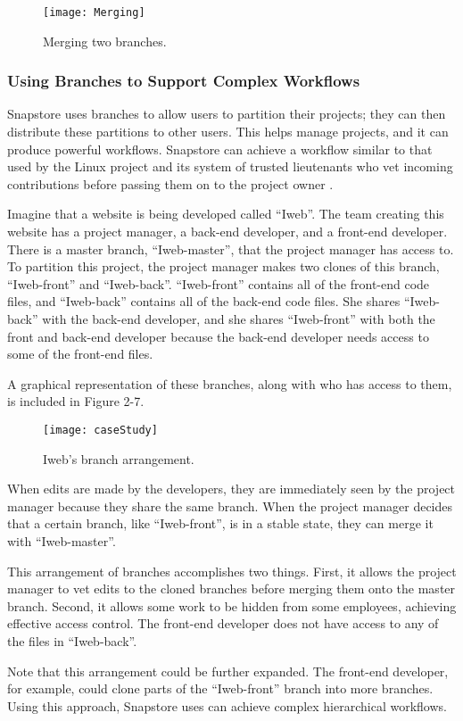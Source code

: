 \begin{figure}
\texttt{[image: Merging]}
\caption{Merging two branches.}
\label{arm:fig1}
\end{figure}

\subsubsection{Using Branches to Support Complex Workflows}

Snapstore uses branches to allow users to partition their projects; they can then distribute these partitions to other users. This helps manage projects, and it can produce powerful workflows. Snapstore can achieve a workflow similar to that used by the Linux project and its system of trusted lieutenants who vet incoming contributions before passing them on to the project owner \cite{linux}.

Imagine that a website is being developed called ``Iweb''. The team creating this website has a project manager, a back-end developer, and a front-end developer. There is a master branch, ``Iweb-master'', that the project manager has access to. To partition this project, the project manager makes two clones of this branch, ``Iweb-front'' and ``Iweb-back''. ``Iweb-front'' contains all of the front-end code files, and ``Iweb-back'' contains all of the back-end code files. She shares ``Iweb-back'' with the back-end developer, and she shares ``Iweb-front'' with both the front and back-end developer because the back-end developer needs access to some of the front-end files.

A graphical representation of these branches, along with who has access to them, is included in Figure 2-7.

\begin{figure}
\texttt{[image: caseStudy]}
\caption{Iweb's branch arrangement.}
\label{arm:fig1}
\end{figure}

When edits are made by the developers, they are immediately seen by the project manager because they share the same branch. When the project manager decides that a certain branch, like ``Iweb-front'', is in a stable state, they can merge it with ``Iweb-master''.

This arrangement of branches accomplishes two things. First, it allows the project manager to vet edits to the cloned branches before merging them onto the master branch. Second, it allows some work to be hidden from some employees, achieving effective access control. The front-end developer does not have access to any of the files in ``Iweb-back''.

Note that this arrangement could be further expanded. The front-end developer, for example, could clone parts of the ``Iweb-front'' branch into more branches. Using this approach, Snapstore uses can achieve complex hierarchical workflows. 




